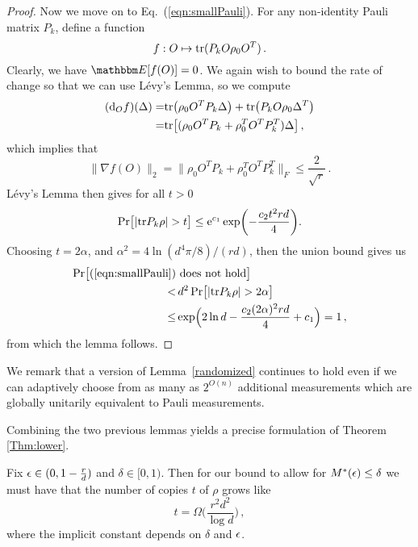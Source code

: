 \begin{proof}
	Now we move on to Eq.~(\ref{eqn:smallPauli}). For any non-identity Pauli
	matrix $P_k$, define a function
	\begin{equation*}
		f: O \mapsto \mathrm{tr}(P_k O \rho_0 O^T) \,.
	\end{equation*}
	Clearly, we have $\EE[f(O)] = 0$. We again wish to bound the rate of change so that we can use L\'evy's Lemma, so we compute
	\begin{align*}
		(\mathrm{d}_O f)(\Delta)  
		=& \mathrm{tr}\bigl(\rho_0 O^T P_k  \Delta\bigr) + \mathrm{tr}\bigl(P_k O \rho_0 \Delta^T\bigr) \\
		=& \mathrm{tr}\bigl[(\rho_0 O^T P_k + \rho_0^T O^T P_k^T) \Delta \bigr]\,,
	\end{align*}
	which implies that
	\begin{equation*}
		\|\nabla f(O)\|_2 =  
		\|\rho_0 O^T P_k + \rho_0^T O^T P_k^T \|_F 
		\leq \frac{2}{\sqrt{r}} \,. 
	\end{equation*}
	L\'evy's Lemma then gives for all $t>0$
	\begin{equation*}
		\Pr\bigl[ \lvert \mathrm{tr} P_k \rho \rvert >  t \bigr]
		\leq
		\mathrm{e}^{c_1} \exp\biggl(- \frac{c_2 t^2 rd}{4}\biggr).
	\end{equation*}
	Choosing $t = 2\alpha$, and $\alpha^2 = 4\ln(d^4 \pi/8)/(rd)$, then the union bound gives us
	\begin{align*}
		\Pr\bigl[ (\ref{eqn:smallPauli}) & \text{ does not hold}\bigr] \\
		< &\, d^2 \Pr\bigl[ |\mathrm{tr} P_k \rho| > 2\alpha\bigr] \\
		\leq& \exp\Bigl(2\ln d -\frac{c_2(2\alpha)^2rd}{4}+ c_1\Bigr) = 1\,,
	\end{align*}
	from which the lemma follows.
	\end{proof}

We remark that a version of Lemma~\ref{randomized} continues to hold even if we can adaptively choose from as many as $2^{O(n)}$ additional measurements which are globally unitarily equivalent to Pauli measurements. 

Combining the two previous lemmas yields a precise formulation of Theorem \ref{Thm:lower}.
\begin{theorem}
	Fix $\epsilon \in (0, 1-\tfrac{r}{d})$ and $\delta \in [0,1)$. Then for our bound to allow for $M^*(\epsilon) \le \delta$ we must have that the number of copies $t$ of $\rho$ grows like
	\begin{equation*}
		t = \Omega\biggl(\frac{r^2 d^2}{\log d}\biggr)\,,
	\end{equation*}
	where the implicit constant depends on $\delta$ and $\epsilon$.
\end{theorem}

